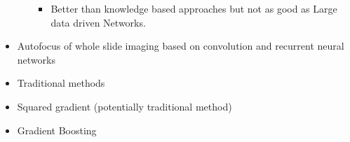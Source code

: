 \begin{itemize}
\begin{itemize}
\begin{itemize}
            \item Better than knowledge based approaches but not as good as Large data driven Networks.
        \end{itemize}
    \end{itemize}
    \item Autofocus of whole slide imaging based on convolution and recurrent neural networks \cite{xiang2021autofocus}
    \item Traditional methods \cite{redondo2012autofocus}
    \item Squared gradient (potentially traditional method)
    \item Gradient Boosting \cite{liang2019learning}

\end{itemize}


